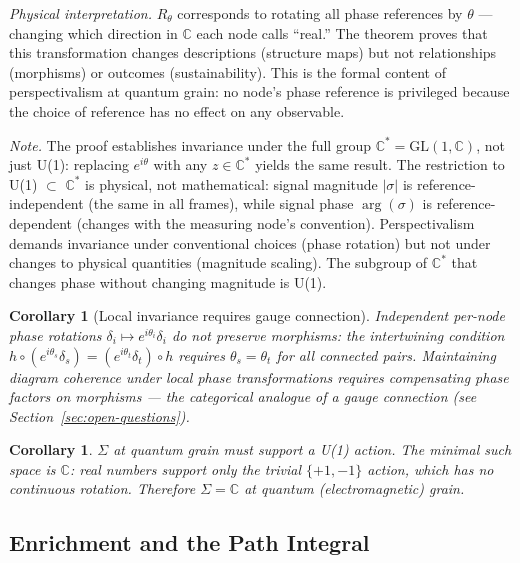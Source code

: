 \documentclass[12pt,a4paper]{article}
\newtheorem{corollary}[theorem]{Corollary}
\begin{document}
\emph{Physical interpretation.} $R_\theta$ corresponds to rotating all phase references by $\theta$ --- changing which direction in $\mathbb{C}$ each node calls ``real.'' The theorem proves that this transformation changes descriptions (structure maps) but not relationships (morphisms) or outcomes (sustainability). This is the formal content of perspectivalism at quantum grain: no node's phase reference is privileged because the choice of reference has no effect on any observable.

\emph{Note.} The proof establishes invariance under the full group $\mathbb{C}^* = \text{GL}(1, \mathbb{C})$, not just U(1): replacing $e^{i\theta}$ with any $z \in \mathbb{C}^*$ yields the same result. The restriction to U(1) $\subset$ $\mathbb{C}^*$ is physical, not mathematical: signal magnitude $|\sigma|$ is reference-independent (the same in all frames), while signal phase $\arg(\sigma)$ is reference-dependent (changes with the measuring node's convention). Perspectivalism demands invariance under conventional choices (phase rotation) but not under changes to physical quantities (magnitude scaling). The subgroup of $\mathbb{C}^*$ that changes phase without changing magnitude is U(1).

\begin{corollary}[Local invariance requires gauge connection]
\label{cor:gauge-connection}
Independent per-node phase rotations $\delta_i \mapsto e^{i\theta_i}\delta_i$ do not preserve morphisms: the intertwining condition $h \circ (e^{i\theta_s}\delta_s) = (e^{i\theta_t}\delta_t) \circ h$ requires $\theta_s = \theta_t$ for all connected pairs. Maintaining diagram coherence under local phase transformations requires compensating phase factors on morphisms --- the categorical analogue of a gauge connection (see Section~\ref{sec:open-questions}).
\end{corollary}

\begin{corollary}
\label{cor:sigma-c}
$\Sigma$ at quantum grain must support a U(1) action. The minimal such space is $\mathbb{C}$: real numbers support only the trivial $\{+1, -1\}$ action, which has no continuous rotation. Therefore $\Sigma = \mathbb{C}$ at quantum (electromagnetic) grain.
\end{corollary}

\subsection{Enrichment and the Path Integral}
\label{sec:enrichment}
\end{document}
